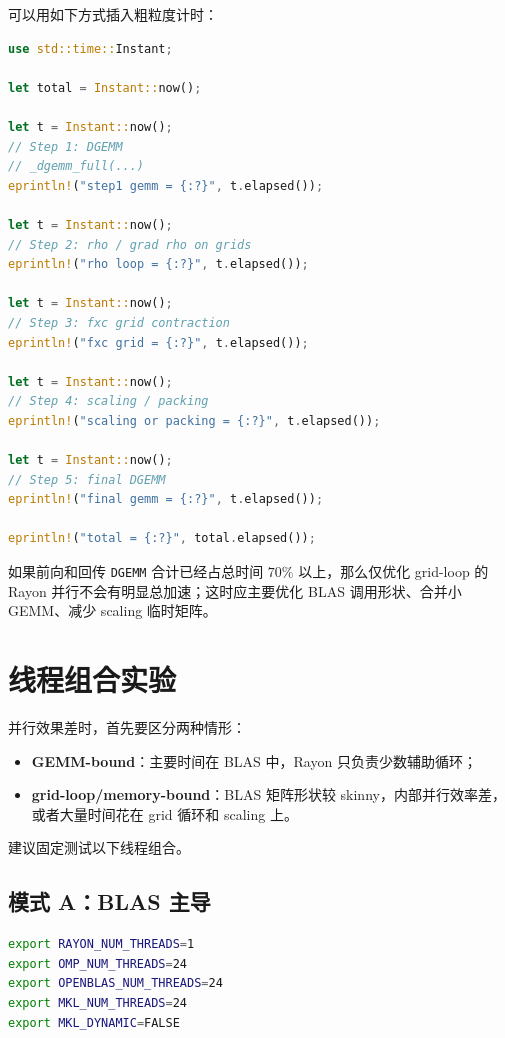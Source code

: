 \documentclass[11pt,a4paper]{ctexart}
\begin{document}
可以用如下方式插入粗粒度计时：

\begin{lstlisting}[language=Rust,style=code]
use std::time::Instant;

let total = Instant::now();

let t = Instant::now();
// Step 1: DGEMM
// _dgemm_full(...)
eprintln!("step1 gemm = {:?}", t.elapsed());

let t = Instant::now();
// Step 2: rho / grad rho on grids
eprintln!("rho loop = {:?}", t.elapsed());

let t = Instant::now();
// Step 3: fxc grid contraction
eprintln!("fxc grid = {:?}", t.elapsed());

let t = Instant::now();
// Step 4: scaling / packing
eprintln!("scaling or packing = {:?}", t.elapsed());

let t = Instant::now();
// Step 5: final DGEMM
eprintln!("final gemm = {:?}", t.elapsed());

eprintln!("total = {:?}", total.elapsed());
\end{lstlisting}

如果前向和回传 \texttt{DGEMM} 合计已经占总时间 $70\%$ 以上，那么仅优化 grid-loop 的 Rayon 并行不会有明显总加速；这时应主要优化 BLAS 调用形状、合并小 GEMM、减少 scaling 临时矩阵。

\section{线程组合实验}

并行效果差时，首先要区分两种情形：

\begin{itemize}[leftmargin=2em]
  \item \textbf{GEMM-bound}：主要时间在 BLAS 中，Rayon 只负责少数辅助循环；
  \item \textbf{grid-loop/memory-bound}：BLAS 矩阵形状较 skinny，内部并行效率差，或者大量时间花在 grid 循环和 scaling 上。
\end{itemize}

建议固定测试以下线程组合。

\subsection{模式 A：BLAS 主导}

\begin{lstlisting}[language=bash,style=code]
export RAYON_NUM_THREADS=1
export OMP_NUM_THREADS=24
export OPENBLAS_NUM_THREADS=24
export MKL_NUM_THREADS=24
export MKL_DYNAMIC=FALSE
\end{lstlisting}
\end{document}
